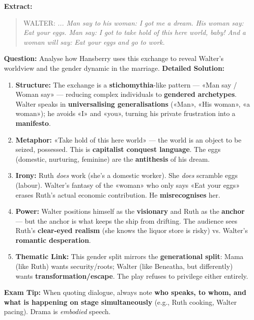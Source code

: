 \documentclass[11pt]{article}
\begin{document}
\begin{exoresolu}
\textbf{Extract:}
\begin{quote}
WALTER: \textit{... Man say to his woman: I got me a dream. His woman say: Eat your eggs. Man say: I got to take hold of this here world, baby! And a woman will say: Eat your eggs and go to work.}
\end{quote}

\textbf{Question:} Analyse how Hansberry uses this exchange to reveal Walter's worldview and the gender dynamic in the marriage.
\tcblower
\textbf{Detailed Solution:}

\begin{enumerate}
\item \textbf{Structure:} The exchange is a \textbf{stichomythia}-like pattern — «Man say / Woman say» — reducing complex individuals to \textbf{gendered archetypes}. Walter speaks in \textbf{universalising generalisations} («Man», «His woman», «a woman»); he avoids «I» and «you», turning his private frustration into a \textbf{manifesto}.
\item \textbf{Metaphor:} «Take hold of this here world» — the world is an object to be seized, possessed. This is \textbf{capitalist conquest language}. The eggs (domestic, nurturing, feminine) are the \textbf{antithesis} of his dream.
\item \textbf{Irony:} Ruth \emph{does} work (she's a domestic worker). She \emph{does} scramble eggs (labour). Walter's fantasy of the «woman» who only says «Eat your eggs» erases Ruth's actual economic contribution. He \textbf{misrecognises} her.
\item \textbf{Power:} Walter positions himself as the \textbf{visionary} and Ruth as the \textbf{anchor} — but the anchor is what keeps the ship from drifting. The audience sees Ruth's \textbf{clear-eyed realism} (she knows the liquor store is risky) vs. Walter's \textbf{romantic desperation}.
\item \textbf{Thematic Link:} This gender split mirrors the \textbf{generational split}: Mama (like Ruth) wants security/roots; Walter (like Beneatha, but differently) wants \textbf{transformation/escape}. The play refuses to privilege either entirely.
\end{enumerate}

\textbf{Exam Tip:} When quoting dialogue, always note \textbf{who speaks, to whom, and what is happening on stage simultaneously} (e.g., Ruth cooking, Walter pacing). Drama is \emph{embodied} speech.
\end{exoresolu}
\end{document}
